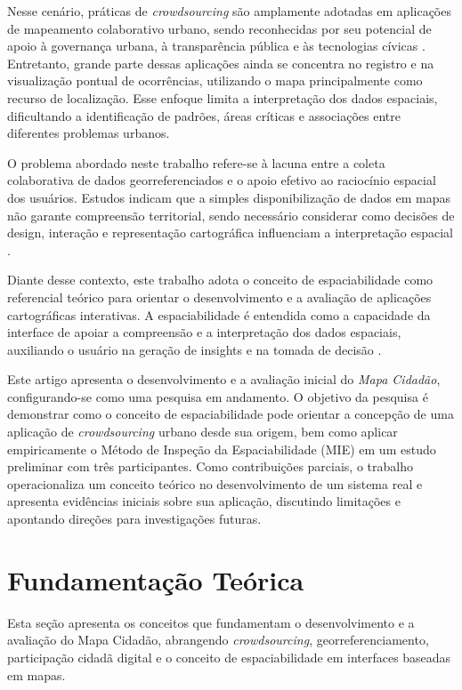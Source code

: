 \documentclass[12pt]{article}
\begin{document}
Nesse cenário, práticas de \textit{crowdsourcing} são amplamente adotadas em aplicações de mapeamento colaborativo urbano, sendo reconhecidas por seu potencial de apoio à governança urbana, à transparência pública e às tecnologias cívicas \cite{gonzaga:2025,torquato:2024}. Entretanto, grande parte dessas aplicações ainda se concentra no registro e na visualização pontual de ocorrências, utilizando o mapa principalmente como recurso de localização. Esse enfoque limita a interpretação dos dados espaciais, dificultando a identificação de padrões, áreas críticas e associações entre diferentes problemas urbanos.

O problema abordado neste trabalho refere-se à lacuna entre a coleta colaborativa de dados georreferenciados e o apoio efetivo ao raciocínio espacial dos usuários. Estudos indicam que a simples disponibilização de dados em mapas não garante compreensão territorial, sendo necessário considerar como decisões de design, interação e representação cartográfica influenciam a interpretação espacial \cite{haklay:2012,see:2016}.

Diante desse contexto, este trabalho adota o conceito de espaciabilidade como referencial teórico para orientar o desenvolvimento e a avaliação de aplicações cartográficas interativas. A espaciabilidade é entendida como a capacidade da interface de apoiar a compreensão e a interpretação dos dados espaciais, auxiliando o usuário na geração de insights e na tomada de decisão \cite{neto:ihc}.

Este artigo apresenta o desenvolvimento e a avaliação inicial do \textit{Mapa Cidadão}, configurando-se como uma pesquisa em andamento. O objetivo da pesquisa é demonstrar como o conceito de espaciabilidade pode orientar a concepção de uma aplicação de \textit{crowdsourcing} urbano desde sua origem, bem como aplicar empiricamente o Método de Inspeção da Espaciabilidade (MIE) em um estudo preliminar com três participantes. Como contribuições parciais, o trabalho operacionaliza um conceito teórico no desenvolvimento de um sistema real e apresenta evidências iniciais sobre sua aplicação, discutindo limitações e apontando direções para investigações futuras.





\section{Fundamentação Teórica}

Esta seção apresenta os conceitos que fundamentam o desenvolvimento e a avaliação do Mapa Cidadão, abrangendo \textit{crowdsourcing}, georreferenciamento, participação cidadã digital e o conceito de espaciabilidade em interfaces baseadas em mapas.
\end{document}

